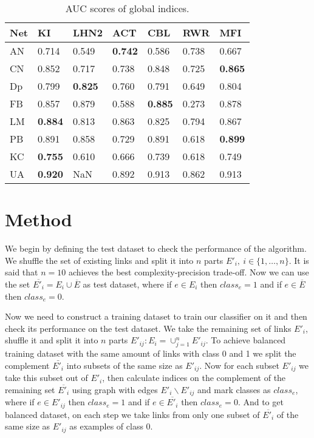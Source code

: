 \documentclass{llncs}
\begin{document}
%
\setlength{\tabcolsep}{5pt}
\renewcommand{\arraystretch}{1.5}
\begin{table}
\begin{center}
\caption{AUC scores of global indices.}
\begin{tabular}{| l | l | l | l | l | l | l |}
\hline
Net & KI & LHN2 & ACT & CBL & RWR & MFI \\ \hline
AN & 0.714 & 0.549 & \textbf{0.742} & 0.586 & 0.738 & 0.667 \\ \hline
CN & 0.852 & 0.717 & 0.738 & 0.848 & 0.725 & \textbf{0.865} \\ \hline
Dp & 0.799 & \textbf{0.825} & 0.760 & 0.791 & 0.649 & 0.804 \\ \hline
FB & 0.857 & 0.879 & 0.588 & \textbf{0.885} & 0.273 & 0.878 \\ \hline
LM & \textbf{0.884} & 0.813 & 0.863 & 0.825 & 0.794 & 0.867 \\ \hline
PB & 0.891 & 0.858 & 0.729 & 0.891 & 0.618 & \textbf{0.899} \\ \hline
KC & \textbf{0.755} & 0.610 & 0.666 & 0.739 & 0.618 & 0.749 \\ \hline
UA & \textbf{0.920} & NaN & 0.892 & 0.913 & 0.862 & 0.913 \\ 
\hline
\end{tabular}
\end{center}
\end{table}
%
\section{Method}
%
We begin by defining the test dataset to check the performance of the algorithm. We shuffle the set of existing links and split it into $n$ parts $E'_i, \ i \in \{1, \ldots, n\}$. It is said that $n = 10$ achieves the best complexity-precision trade-off. Now we can use the set $\overline{E'_i} = E_i \cup \overline{E}$ as test dataset, where if $e \in E_i$ then $class_e = 1$ and if $e \in \overline{E}$ then $class_e = 0$.

Now we need to construct a training dataset to train our classifier on it and then check its performance on the test dataset. We take the remaining set of links $E'_i$, shuffle it and split it into $n$ parts $E'_{ij} : E_i = \cup_{j = 1}^{n} E'_{ij}$. To achieve balanced training dataset with the same amount of links with class 0 and 1 we split the complement $\bar{E'_i}$ into subsets of the same size as $E'_{ij}$. Now for each subset $E'_{ij}$ we take this subset out of $E'_i$, then calculate indices on the complement of the remaining set $\overline{E'_i}$ using graph with edges $E'_i \backslash E'_{ij}$ and mark classes as $class_e$, where if $e \in E'_{ij}$ then $class_e = 1$ and if $e \in \overline{E'_i}$ then $class_e = 0$. And to get balanced dataset, on each step we take links from only one subset of $\overline{E'_i}$ of the same size as $E'_{ij}$ as examples of class 0.
\end{document}
